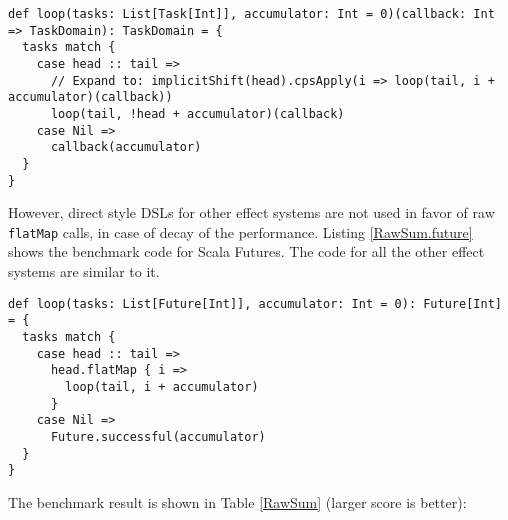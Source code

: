\begin{lstlisting}[float=htbp,caption={The most efficient implementation of sum based on vanilla CPS function},label={RawSum.dsl}]
def loop(tasks: List[Task[Int]], accumulator: Int = 0)(callback: Int => TaskDomain): TaskDomain = {
  tasks match {
    case head :: tail =>
      // Expand to: implicitShift(head).cpsApply(i => loop(tail, i + accumulator)(callback))
      loop(tail, !head + accumulator)(callback)
    case Nil =>
      callback(accumulator)
  }
}
\end{lstlisting}

However, direct style DSLs for other effect systems are not used in favor of raw \lstinline{flatMap} calls, in case of decay of the performance. Listing \ref{RawSum.future} shows the benchmark code for Scala Futures. The code for all the other effect systems are similar to it.

\begin{lstlisting}[float=htbp,caption={The most efficient implementation of sum based on Scala Futures},label={RawSum.future}]
def loop(tasks: List[Future[Int]], accumulator: Int = 0): Future[Int] = {
  tasks match {
    case head :: tail =>
      head.flatMap { i =>
        loop(tail, i + accumulator)
      }
    case Nil =>
      Future.successful(accumulator)
  }
}
\end{lstlisting}

The benchmark result is shown in Table \ref{RawSum} (larger score is better):

